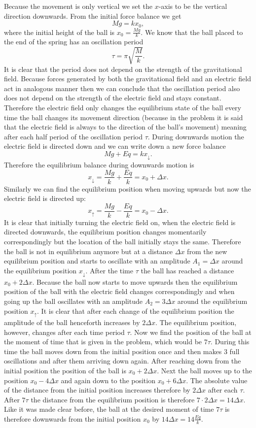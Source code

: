 {\ifEngSolution
Because the movement is only vertical we set the $x$-axis to be the vertical direction downwards. From the initial force balance we get
$$Mg = kx_0,$$
where the initial height of the ball is $x_0 = \frac{Mg}{k}$. We know that the ball placed to the end of the spring has an oscillation period
$$\tau = \pi \sqrt{\frac{M}{k}}.$$ 
It is clear that the period does not depend on the strength of the gravitational field. Because forces generated by both the gravitational field and an electric field act in analogous manner then we can conclude that the oscillation period also does not depend on the strength of the electric field and stays constant. Therefore the electric field only changes the equilibrium state of the ball every time the ball changes its movement direction (because in the problem it is said that the electric field is always to the direction of the ball’s movement) meaning after each half period of the oscillation period $\tau$. During downwards motion the electric field is directed down and we can write down a new force balance
$$Mg + Eq = kx_\downarrow.$$ 
Therefore the equilibrium balance during downwards motion is 
$$x_\downarrow = \frac{Mg}{k} + \frac{Eq}{k} = x_0 + \Delta x.$$ 
Similarly we can find the equilibrium position when moving upwards but now the electric field is directed up:
$$x_\uparrow = \frac{Mg}{k} - \frac{Eq}{k} = x_0 - \Delta x.$$ 
It is clear that initially turning the electric field on, when the electric field is directed downwards, the equilibrium position changes momentarily correspondingly but the location of the ball initially stays the same. Therefore the ball is not in equilibrium anymore but at a distance $\Delta x$ from the new equilibrium position and starts to oscillate with an amplitude $A_1 = \Delta x$ around the equilibrium position $x_\downarrow$. After the time $\tau$ the ball has reached a distance $x_0 + 2\Delta x$. Because the ball now starts to move upwards then the equilibrium position of the ball with the electric field changes correspondingly and when going up the ball oscillates with an amplitude $A_2 = 3 \Delta x$ around the equilibrium position $x_\uparrow$. It is clear that after each change of the equilibrium position the amplitude of the ball henceforth increases by $2 \Delta x$. The equilibrium position, however, changes after each time period $\tau$. Now we find the position of the ball at the moment of time that is given in the problem, which would be $7 \tau$. During this time the ball moves down from the initial position once and then makes $3$ full oscillations and after them arriving down again. After reaching down from the initial position the position of the ball is $x_0 + 2 \Delta x $. Next the ball moves up to the position $x_0 - 4 \Delta x$ and again down to the position $x_0 + 6 \Delta x$. The absolute value of the distance from the initial position increases therefore by $2 \Delta x$ after each $\tau$. After $7 \tau$ the distance from the equilibrium position is therefore $7 \cdot 2 \Delta x = 14 \Delta x$. Like it was made clear before, the ball at the desired moment of time $7 \tau$ is therefore downwards from the initial position $x_0$ by $14 \Delta x = 14 \frac{Eq}{k}$.
\fi
}